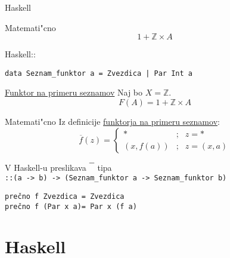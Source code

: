 \documentclass[t,usenames,dvipsnames]{beamer} %
\newcommand{\Z}{\mathbb Z}
\begin{document}
\begin{frame}{Haskell}


\begin{block}{Matemati"cno}
	$$ 1+\Z \times A $$
	
\end{block}

Haskell::


\begin{beamerboxesrounded}[lower=loweryel,shadow=false]{}
	\texttt{data Seznam\_funktor a = Zvezdica | Par Int a}
\end{beamerboxesrounded}


\begin{block}{\underline{Funktor na primeru seznamov}}
	Naj bo $X = \Z$.
	$$ F(A) = 1+\Z \times A $$
	
\end{block}



	
\end{frame}



\begin{frame}

\begin{block}{Matemati"cno}
	Iz definicije \underline{funktorja na primeru seznamov}:
		$$ \overline{f}(z) = 
		\left\{ \begin{array}{cll}
		* & ; & z = * \\
		(x, f(a)) & ; & z = (x, a)
		\end{array} \right. $$ 
	
\end{block}	
	V Haskell-u preslikava
	$ \overline{\textcolor{white}{h} } $ 
	tipa \\
	\texttt{::(a -> b) -> (Seznam\_funktor a -> Seznam\_funktor b)} \\
	\begin{beamerboxesrounded}[lower=loweryel,shadow=false]{}
		\texttt{prečno f Zvezdica = Zvezdica} \\
		\texttt{prečno f (Par x a)= Par x (f a)}
	\end{beamerboxesrounded}
\end{frame}

\section{Haskell}
\end{document}
